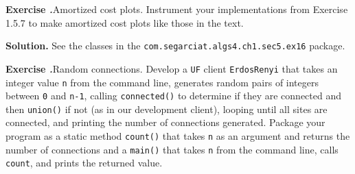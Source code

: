 \documentclass[12pt, a4paper]{article}
\newenvironment{ex}[2][Exercise]
{\par\medskip\noindent \textbf{#1 #2.}}
{\medskip}
\newenvironment{sol}[1][Solution]
{\par\medskip\noindent \textbf{#1.} }
{\medskip}
\begin{document}
	\begin{ex}{16}
		\emph{Amortized cost plots}. Instrument your implementations from Exercise 1.5.7
		to make amortized cost plots like those in the text.
	\end{ex}
	\begin{sol}
		See the classes in the \texttt{com.segarciat.algs4.ch1.sec5.ex16} package.
	\end{sol}
	\begin{ex}{17}
		\emph{Random connections}. Develop a \texttt{UF} client \texttt{ErdosRenyi} that
		takes an  integer value \texttt{n} from the command line, generates random pairs of
		integers between \texttt{0} and \texttt{n-1}, calling \texttt{connected()} to
		determine if they are connected and then \texttt{union()} if not (as in our
		development client), looping until all sites are connected, and printing the number
		of connections generated. Package your program as a static method \texttt{count()}
		that takes \texttt{n} as an argument and returns the number of connections and
		a \texttt{main()} that takes \texttt{n} from the command line, calls \texttt{count},
		and prints the returned value.
	\end{ex}
	\pagebreak
	\printbibliography
\end{document}
